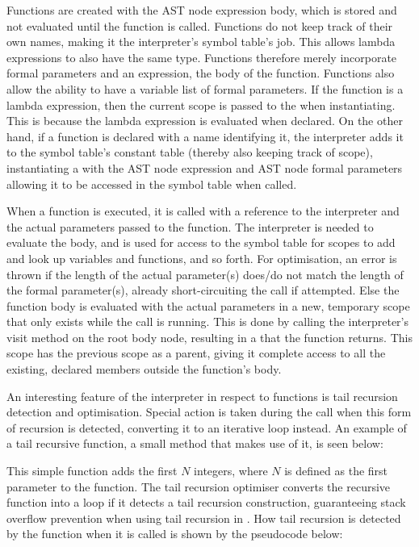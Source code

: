 Functions are created with the AST node expression body, which is
stored and not evaluated until the function is called. Functions
do not keep track of their own names, making it the interpreter's
symbol table's job. This allows lambda expressions to also have the
same type. Functions therefore merely incorporate formal parameters
and an expression, the body of the function. Functions also allow
the ability to have a variable list of formal parameters. If the
function is a lambda expression, then the current scope is passed to
the  when instantiating. This is because the lambda
expression is evaluated when declared. On the other hand, if a function
is declared with a name identifying it, the interpreter adds it to the
symbol table's constant table (thereby also keeping track of scope),
instantiating a  with the AST node expression and AST
node formal parameters allowing it to be accessed in the symbol table
when called.

When a function is executed, it is called with a reference to the interpreter
and the actual parameters passed to the function. The interpreter is needed to
evaluate the body, and is used for access to the symbol table for scopes to add
and look up variables and functions, and so forth. For optimisation, an error is
thrown if the length of the actual parameter(s) does/do not match the length of
the formal parameter(s), already short-circuiting the call if attempted. Else
the function body is evaluated with the actual parameters in a new, temporary
scope that only exists while the call is running. This is done by calling the
interpreter's visit method on the root body node, resulting in a
 that the function returns. This scope has the previous scope as
a parent, giving it complete access to all the existing, declared members
outside the function's body.

An interesting feature of the interpreter in respect to functions is tail
recursion detection and optimisation. Special action is taken during the call
when this form of recursion is detected, converting it to an iterative loop
instead. An example of a tail recursive function, a small method
 that makes use of it, is seen below:


This simple function adds the first $N$ integers, where $N$ is defined as the
first parameter to the function. The tail recursion optimiser converts the
recursive function into a loop if it detects a tail recursion construction,
guaranteeing stack overflow prevention when using tail recursion in
\productname. How tail recursion is detected by the function when it is called
is shown by the pseudocode below:

